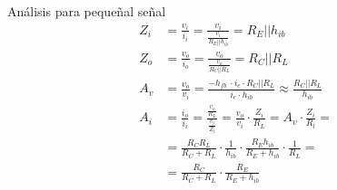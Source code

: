 \begin{frame}[allowframebreaks]{Análisis para pequeñal señal}
\begin{align*}
    Z_i &= \frac{v_i}{i_i} = \frac{v_i}{\frac{v_i}{R_E || h_{ib}}} = R_E || h_{ib} \\[6pt]
    Z_o &= \frac{v_o}{i_o} = \frac{v_o}{\frac{v_o}{R_C || R_L}} = R_C || R_L \\[6pt]
    A_v &= \frac{v_o}{v_i} = \frac{-h_{fb} \ \cdot i_e \cdot R_C || R_L}{i_e\cdot h_{ib}} \approx \frac{R_C||R_L}{h_{ib}} \\[6pt]
    A_i &= \frac{i_o}{i_i} = \frac{\frac{v_o}{R_L}}{\frac{v_i}{Z_i}} = \frac{v_o}{v_i}\cdot \frac{Z_i}{R_L} = A_v \cdot \frac{Z_i}{R_l} = \\[6pt]
    &= \frac{R_C R_L}{R_C + R_L} \cdot \frac{1}{h_{ib}} \cdot \frac{R_E h_{ib}}{R_E + h_{ib}} \cdot \frac{1}{R_L} = \\[6pt]
    &= \frac{R_C}{R_C+R_L} \cdot \frac{R_E}{R_E + h_{ib}}
\end{align*}

\end{frame}
